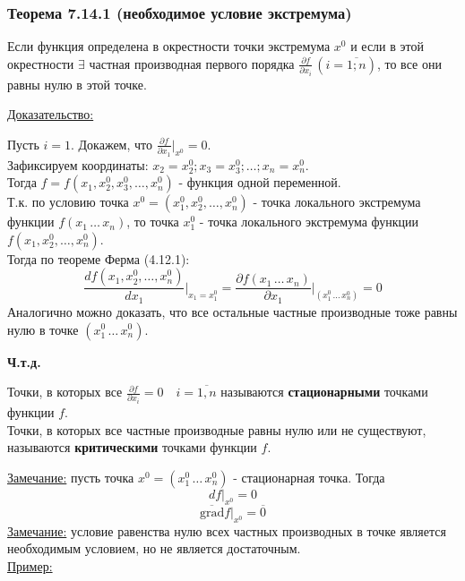 \documentclass[12pt]{article}
\begin{document}
    \subsubsection*{Теорема 7.14.1 (необходимое условие экстремума)}\label{th:7.14.1}
    Если функция определена в окрестности точки экстремума $x^0$ и если в этой окрестности $\exists$ частная производная первого порядка $\frac{\partial f}{\partial x_i}\,(i = \overline{1;n})$, то все они равны нулю в этой точке.\par\noindent
    \underline{Доказательство:}
    \begin{adjustwidth}{1.5em}{1.5em}
        Пусть $i = 1$. Докажем, что $\frac{\partial f}{\partial x_1} \Big|_{x^0} = 0$.\\
        Зафиксируем координаты: $x_2 = x^0_2; x_3 = x^0_3; \dots; x_n = x^0_n$.\\
        Тогда $f = f(x_1, x^0_2, x^0_3, \dots, x^0_n)$ - функция одной переменной.\\
        Т.к. по условию точка $x^0 = (x^0_1, x^0_2, \dots, x^0_n)$ - точка локального экстремума функции $f(x_1\, \dots\, x_n)$, то точка $x^0_1$ - точка локального экстремума функции $f(x_1, x^0_2, \dots, x^0_n)$.\\
        Тогда по теореме Ферма (4.12.1):
        \[ \frac{df(x_1, x^0_2, \dots, x^0_n)}{dx_1} \Big|_{x_1 = x^0_1} = \frac{\partial f(x_1\, \dots\, x_n)}{\partial x_1} \Big|_{(x^0_1\, \dots\, x^0_n)} = 0 \]
        Аналогично можно доказать, что все остальные частные производные тоже равны нулю в точке $(x^0_1\, \dots\, x^0_n)$.
        \begin{center}
            \textbf{Ч.т.д.}
        \end{center}
    \end{adjustwidth}
    Точки, в которых все $\frac{\partial f}{\partial x_i} = 0 \quad i = \overline{1,n}$ называются \textbf{стационарными} точками функции $f$.\\
    Точки, в которых все частные производные равны нулю или не существуют, называются \textbf{критическими} точками функции $f$.\par\noindent
    \underline{Замечание:} пусть точка $x^0 = (x^0_1\, \dots\, x^0_n)$ - стационарная точка. Тогда
    \[ df \Big|_{x^0} = 0 \]
    \[ \overline{\text{grad}}f \Big|_{x^0} = \overline{0} \]
    \underline{Замечание:} условие равенства нулю всех частных производных в точке является необходимым условием, но не является достаточным.\\
    \underline{Пример:}
\end{document}
